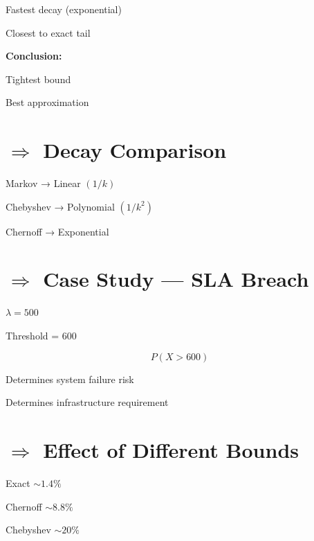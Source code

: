 \documentclass{article}
\begin{document}
Fastest decay (exponential)  

Closest to exact tail  

\vspace{0.2cm}

\textbf{Conclusion:}

Tightest bound  

Best approximation  

\vspace{0.6cm}


\section*{$\Rightarrow$ Decay Comparison}

Markov → Linear $(1/k)$  

Chebyshev → Polynomial $(1/k^2)$  

Chernoff → Exponential  

\vspace{0.6cm}


\section*{$\Rightarrow$ Case Study — SLA Breach}

$\lambda = 500$  

Threshold = 600  

\vspace{0.2cm}

\[
P(X > 600)
\]

\vspace{0.2cm}

Determines system failure risk  

Determines infrastructure requirement  

\vspace{0.6cm}


\section*{$\Rightarrow$ Effect of Different Bounds}

Exact $\sim 1.4\%$  

Chernoff $\sim 8.8\%$  

Chebyshev $\sim 20\%$  
\end{document}

